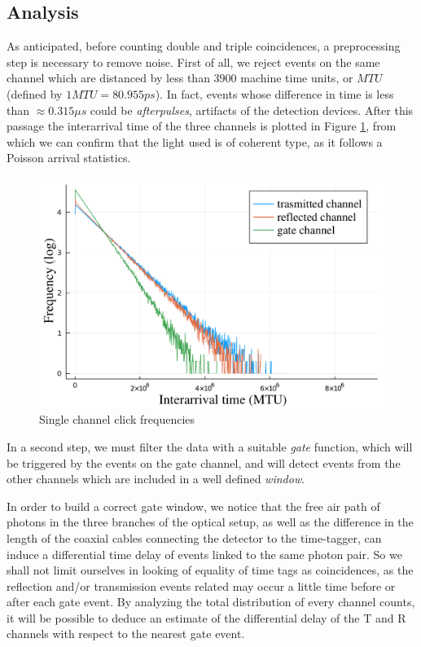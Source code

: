 \documentclass[10pt, final]{article}
\begin{document}
\begin{multicols}{2}
\subsection*{Analysis}
As anticipated, before counting double and triple coincidences, a preprocessing step is necessary to remove noise. First of all, we reject events on the same channel which are distanced by less than $3900$ machine time units, or $MTU$ (defined by $1 MTU = 80.955 ps$). In fact, events whose difference in time is less than $\approx 0.315 \mu s$ could be \emph{afterpulses}, artifacts of the detection devices. After this passage the interarrival time of the three channels is plotted in Figure \ref{exps}, from which we can confirm that the light used is of coherent type, as it follows a Poisson arrival statistics.
\begin{mdframed}
    \begin{figure}[H]
        \centering
        \includegraphics[width = \textwidth]{../images/single_chan.pdf}
        \caption{Single channel click frequencies}
        \label{exps}
    \end{figure}
\end{mdframed}

In a second step, we must filter the data with a suitable \emph{gate} function, which will be triggered by the events on the gate channel, and will detect events from the other channels which are included in a well defined \emph{window}. 

In order to build a correct gate window, we notice that the free air path of photons in the three branches of the optical setup, as well as the difference in the length of the coaxial cables connecting the detector to the time-tagger, can induce a differential time delay of events linked to the same photon pair. So we shall not limit ourselves in looking of equality of time tags as coincidences, as the reflection and/or transmission events related may occur a little time before or after each gate event. By analyzing the total distribution of every channel counts, it will be possible to deduce an estimate of the differential delay of the T and R channels with respect to the nearest gate event.


\end{multicols}
\end{document}
